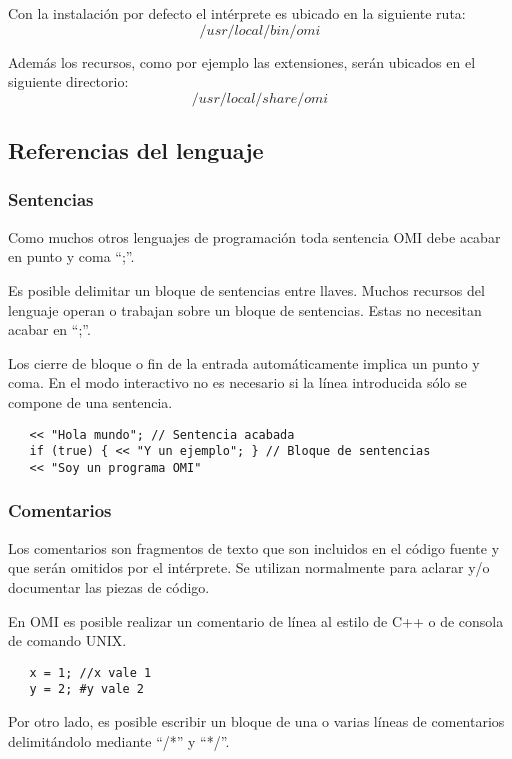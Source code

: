 Con la instalación por defecto el intérprete es ubicado en la siguiente ruta:
$$/usr/local/bin/omi$$

Además los recursos, como por ejemplo las extensiones, serán ubicados en el siguiente directorio:
$$/usr/local/share/omi$$

\lstset {language=omi}
\subsection{Referencias del lenguaje}
\subsubsection{Sentencias} \label{sec:stmt}
Como muchos otros lenguajes de programación toda sentencia OMI debe acabar en punto y coma ``;''. 

Es posible delimitar un bloque de sentencias entre llaves. Muchos recursos del lenguaje operan 
 o trabajan sobre un bloque de sentencias. Estas no necesitan acabar en ``;''.

Los cierre de bloque o fin de la entrada automáticamente implica un punto y coma.
En el modo interactivo no es necesario si la línea introducida sólo se compone de una sentencia. \\

\begin{lstlisting}
   << "Hola mundo"; // Sentencia acabada 
   if (true) { << "Y un ejemplo"; } // Bloque de sentencias 
   << "Soy un programa OMI"
\end{lstlisting}

\subsubsection{Comentarios}\label{sec:comments}
Los comentarios son fragmentos de texto que son incluidos en el código fuente y que serán omitidos por el intérprete. Se utilizan normalmente para aclarar y/o documentar las
piezas de código. 

En OMI es posible realizar un comentario de línea al estilo de C++ o de consola de comando UNIX. \\

\begin{lstlisting}
   x = 1; //x vale 1
   y = 2; #y vale 2
\end{lstlisting}
 
Por otro lado, es posible escribir un bloque de una o varias líneas de comentarios delimitándolo mediante ``/*'' y ``*/''. \\

